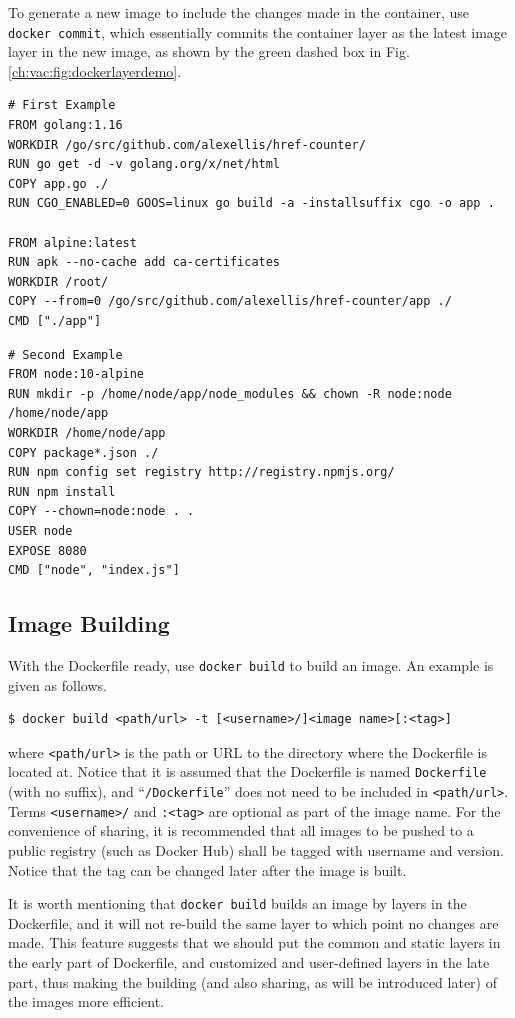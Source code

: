To generate a new image to include the changes made in the container, use \verb|docker commit|, which essentially commits the container layer as the latest image layer in the new image, as shown by the green dashed box in Fig. \ref{ch:vac:fig:dockerlayerdemo}.

\begin{lstlisting}
# First Example
FROM golang:1.16
WORKDIR /go/src/github.com/alexellis/href-counter/
RUN go get -d -v golang.org/x/net/html
COPY app.go ./
RUN CGO_ENABLED=0 GOOS=linux go build -a -installsuffix cgo -o app .

FROM alpine:latest
RUN apk --no-cache add ca-certificates
WORKDIR /root/
COPY --from=0 /go/src/github.com/alexellis/href-counter/app ./
CMD ["./app"]
\end{lstlisting}

\begin{lstlisting}
# Second Example
FROM node:10-alpine
RUN mkdir -p /home/node/app/node_modules && chown -R node:node /home/node/app
WORKDIR /home/node/app
COPY package*.json ./
RUN npm config set registry http://registry.npmjs.org/
RUN npm install
COPY --chown=node:node . .
USER node
EXPOSE 8080
CMD ["node", "index.js"]
\end{lstlisting}

\subsection{Image Building} \label{sec:docker-image-building}

With the Dockerfile ready, use \verb|docker build| to build an image. An example is given as follows.
\begin{lstlisting}
$ docker build <path/url> -t [<username>/]<image name>[:<tag>]
\end{lstlisting}
where \verb|<path/url>| is the path or URL to the directory where the Dockerfile is located at. Notice that it is assumed that the Dockerfile is named \verb|Dockerfile| (with no suffix), and ``\verb|/Dockerfile|'' does not need to be included in \verb|<path/url>|. Terms \verb|<username>/| and \verb|:<tag>| are optional as part of the image name. For the convenience of sharing, it is recommended that all images to be pushed to a public registry (such as Docker Hub) shall be tagged with username and version. Notice that the tag can be changed later after the image is built.

It is worth mentioning that \verb|docker build| builds an image by layers in the Dockerfile, and it will not re-build the same layer to which point no changes are made. This feature suggests that we should put the common and static layers in the early part of Dockerfile, and customized and user-defined layers in the late part, thus making the building (and also sharing, as will be introduced later) of the images more efficient.

